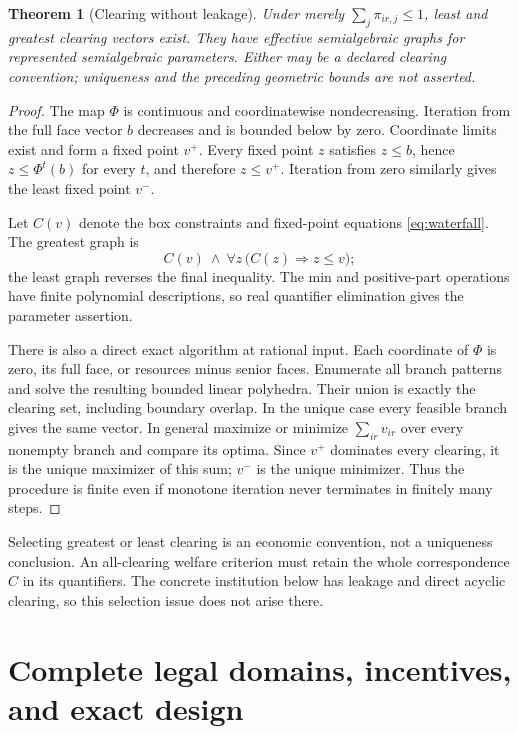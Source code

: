\documentclass[11pt,a4paper]{article}
\numberwithin{equation}{section}
\newtheorem{theorem}{Theorem}[section]
\theoremstyle{definition}
\begin{document}
\begin{theorem}[Clearing without leakage]\label{thm:extremeclearing}
Under merely \(\sum_j\pi_{ir,j}\le1\), least and greatest clearing vectors
exist. They have effective semialgebraic graphs for represented
semialgebraic parameters. Either may be a declared clearing convention;
uniqueness and the preceding geometric bounds are not asserted.
\end{theorem}
\begin{proof}
The map \(\Phi\) is continuous and coordinatewise nondecreasing. Iteration
from the full face vector \(b\) decreases and is bounded below by zero.
Coordinate limits exist and form a fixed point \(v^+\). Every fixed point
\(z\) satisfies \(z\le b\), hence \(z\le\Phi^t(b)\) for every \(t\), and
therefore \(z\le v^+\). Iteration from zero similarly gives the least
fixed point \(v^-\).

Let \(C(v)\) denote the box constraints and fixed-point equations
\eqref{eq:waterfall}. The greatest graph is
\[
 C(v)\ \wedge\ \forall z\,\bigl(C(z)\Longrightarrow z\le v\bigr);
\]
the least graph reverses the final inequality. The min and positive-part
operations have finite polynomial descriptions, so real quantifier
elimination gives the parameter assertion.

There is also a direct exact algorithm at rational input. Each coordinate
of \(\Phi\) is zero, its full face, or resources minus senior faces.
Enumerate all branch patterns and solve the resulting bounded linear
polyhedra. Their union is exactly the clearing set, including boundary
overlap. In the unique case every feasible branch gives the same vector.
In general maximize or minimize \(\sum_{ir}v_{ir}\) over every nonempty
branch and compare its optima. Since \(v^+\) dominates every clearing,
it is the unique maximizer of this sum; \(v^-\) is the unique minimizer.
Thus the procedure is finite even if monotone iteration never terminates
in finitely many steps.
\end{proof}

Selecting greatest or least clearing is an economic convention, not a
uniqueness conclusion. An all-clearing welfare criterion must retain the
whole correspondence \(C\) in its quantifiers. The concrete institution
below has leakage and direct acyclic clearing, so this selection issue
does not arise there.

\section{Complete legal domains, incentives, and exact design}\label{sec:general}
\end{document}
